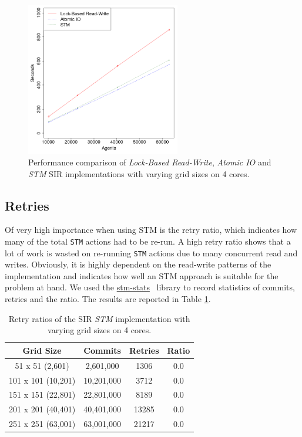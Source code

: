 \begin{figure}
	\centering
	\includegraphics[width=0.6\textwidth, angle=0]{./fig/concurrentabs/sir/sir_varyinggrid_constcores.png}
	\caption{Performance comparison of \textit{Lock-Based Read-Write}, \textit{Atomic IO} and \textit{STM} SIR implementations with varying grid sizes on 4 cores.}
	\label{fig:sir_varyinggrid_constcores}
\end{figure}

\subsection{Retries}
Of very high importance when using STM is the retry ratio, which indicates how many of the total \texttt{STM} actions had to be re-run. A high retry ratio shows that a lot of work is wasted on re-running \texttt{STM} actions due to many concurrent read and writes. Obviously, it is highly dependent on the read-write patterns of the implementation and indicates how well an STM approach is suitable for the problem at hand. We used the \href{http://hackage.haskell.org/package/stm-stats}{stm-stats}~\cite{stm_stats_library} library to record statistics of commits, retries and the ratio. The results are reported in Table \ref{tab:retries_stm}.

\begin{table}
	\centering
  	\begin{tabular}{ c || c | c | c }
        Grid Size 		   & Commits     & Retries  & Ratio  \\ \hline \hline 
   		51 x 51 (2,601)     & 2,601,000   & 1306     & 0.0    \\ \hline
   		101 x 101 (10,201)  & 10,201,000  & 3712     & 0.0    \\ \hline
   		151 x 151 (22,801)  & 22,801,000  & 8189     & 0.0    \\ \hline
   		201 x 201 (40,401)  & 40,401,000  & 13285    & 0.0    \\ \hline
   		251 x 251 (63,001)  & 63,001,000  & 21217    & 0.0    \\ \hline \hline
  	\end{tabular}
  	
  	\caption{Retry ratios of the SIR \textit{STM} implementation with varying grid sizes on 4 cores.}
	\label{tab:retries_stm}
\end{table}

